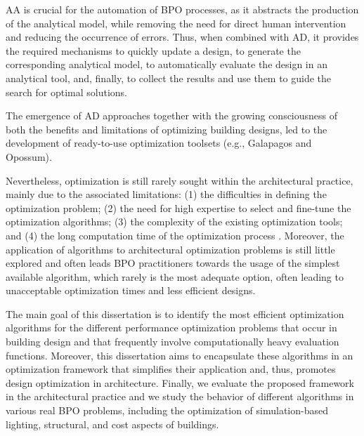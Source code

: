 	\ac{AA} is crucial for the automation of \ac{BPO} processes, as it abstracts the production of the analytical model, while removing the need for direct human intervention and reducing the occurrence of errors. Thus, when combined with \ac{AD}, it provides the required mechanisms to quickly update a design, to generate the corresponding analytical model, to automatically evaluate the design in an analytical tool, and, finally, to collect the results and use them to guide the search for optimal solutions. 

	The emergence of \ac{AD} approaches together with the growing consciousness of both the benefits and limitations of optimizing building designs, led to the development of ready-to-use optimization toolsets (e.g., Galapagos and Opossum). 
		
	Nevertheless, optimization is still rarely sought within the architectural practice, mainly due to the associated limitations: (1) the difficulties in defining the optimization problem; (2) the need for high expertise to select and fine-tune the optimization algorithms; (3) the complexity of the existing optimization tools; and (4) the long computation time of the optimization process \cite{Attia2013}. Moreover, the application of algorithms to architectural optimization problems is still little explored and often leads \ac{BPO} practitioners towards the usage of the simplest available algorithm, which rarely is the most adequate option, often leading to unacceptable optimization times and less efficient designs. 

	The main goal of this dissertation is to identify the most efficient optimization algorithms for the different performance optimization problems that occur in building design and that frequently involve computationally heavy evaluation functions. Moreover, this dissertation aims to encapsulate these algorithms in an optimization framework that simplifies their application and, thus, promotes design optimization in architecture. Finally, we evaluate the proposed framework in the architectural practice and we study the behavior of different algorithms in various real \ac{BPO} problems, including the optimization of simulation-based lighting, structural, and cost aspects of buildings. 
	